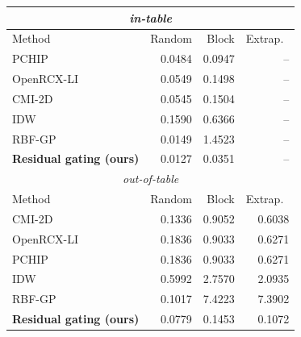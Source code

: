 \small
\begin{tabular}{lrrr}\toprule
\multicolumn{4}{c}{\emph{in-table}} \\\midrule
Method & Random & Block & Extrap.\ \\\midrule
PCHIP & 0.0484 & 0.0947 & -- \\
OpenRCX-LI & 0.0549 & 0.1498 & -- \\
CMI-2D & 0.0545 & 0.1504 & -- \\
IDW & 0.1590 & 0.6366 & -- \\
RBF-GP & 0.0149 & 1.4523 & -- \\
\textbf{Residual gating (ours)} & 0.0127 & 0.0351 & -- \\
\midrule\multicolumn{4}{c}{\emph{out-of-table}} \\\midrule
Method & Random & Block & Extrap.\ \\\midrule
CMI-2D & 0.1336 & 0.9052 & 0.6038 \\
OpenRCX-LI & 0.1836 & 0.9033 & 0.6271 \\
PCHIP & 0.1836 & 0.9033 & 0.6271 \\
IDW & 0.5992 & 2.7570 & 2.0935 \\
RBF-GP & 0.1017 & 7.4223 & 7.3902 \\
\textbf{Residual gating (ours)} & 0.0779 & 0.1453 & 0.1072 \\
\bottomrule\end{tabular}
